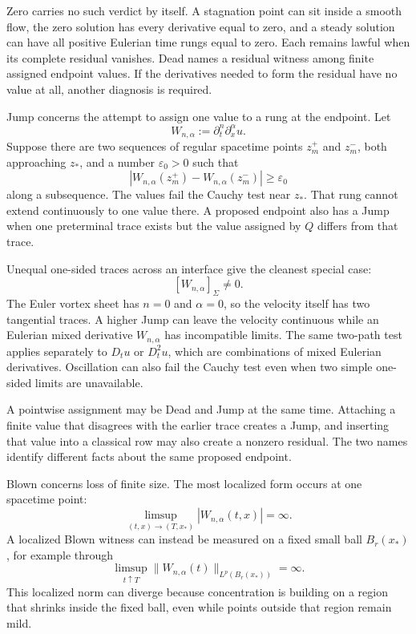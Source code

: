 Zero carries no such verdict by itself.
A stagnation point can sit inside a smooth flow, the zero solution has every derivative equal to zero, and a steady solution can have all positive Eulerian time rungs equal to zero.
Each remains lawful when its complete residual vanishes.
Dead names a residual witness among finite assigned endpoint values.
If the derivatives needed to form the residual have no value at all, another diagnosis is required.


Jump concerns the attempt to assign one value to a rung at the endpoint.
Let
\[
  W_{n,\alpha}
  :=
  \partial_t^n\partial_x^\alpha u.
\]
Suppose there are two sequences of regular spacetime points \(z_m^+\) and \(z_m^-\), both approaching \(z_*\), and a number \(\varepsilon_0>0\) such that
\[
  \left|
    W_{n,\alpha}(z_m^+)
    -
    W_{n,\alpha}(z_m^-)
  \right|
  \geq
  \varepsilon_0
\]
along a subsequence.
The values fail the Cauchy test near \(z_*\).
That rung cannot extend continuously to one value there.
A proposed endpoint also has a Jump when one preterminal trace exists but the value assigned by \(Q\) differs from that trace.

Unequal one-sided traces across an interface give the cleanest special case:
\[
  [W_{n,\alpha}]_\Sigma\neq0.
\]
The Euler vortex sheet has \(n=0\) and \(\alpha=0\), so the velocity itself has two tangential traces.
A higher Jump can leave the velocity continuous while an Eulerian mixed derivative \(W_{n,\alpha}\) has incompatible limits.
The same two-path test applies separately to \(D_tu\) or \(D_t^2u\), which are combinations of mixed Eulerian derivatives.
Oscillation can also fail the Cauchy test even when two simple one-sided limits are unavailable.

A pointwise assignment may be Dead and Jump at the same time.
Attaching a finite value that disagrees with the earlier trace creates a Jump, and inserting that value into a classical row may also create a nonzero residual.
The two names identify different facts about the same proposed endpoint.


Blown concerns loss of finite size.
The most localized form occurs at one spacetime point:
\[
  \limsup_{(t,x)\to(T,x_*)}
  |W_{n,\alpha}(t,x)|
  =
  \infty.
\]
A localized Blown witness can instead be measured on a fixed small ball \(B_r(x_*)\), for example through
\[
  \limsup_{t\uparrow T}
  \|W_{n,\alpha}(t)\|_{L^p(B_r(x_*))}
  =
  \infty.
\]
This localized norm can diverge because concentration is building on a region that shrinks inside the fixed ball, even while points outside that region remain mild.

